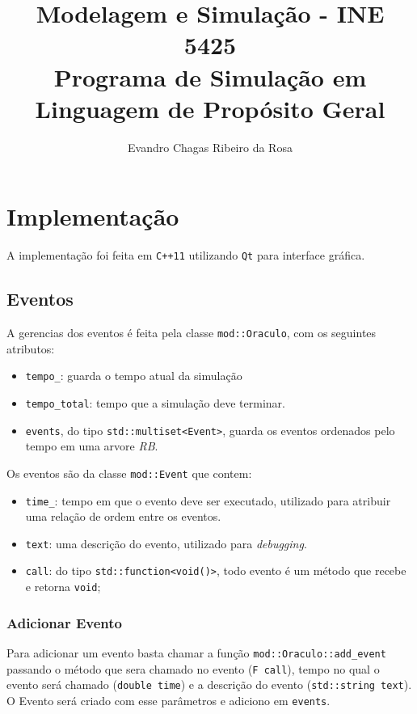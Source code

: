 \documentclass{article}
\title{Modelagem e Simulação - INE 5425\\
Programa de Simulação em Linguagem de Propósito Geral}
\author{Evandro Chagas Ribeiro da Rosa}
\begin{document}
\maketitle

\section{Implementação}
A implementação foi feita em \texttt{C++11} utilizando \texttt{Qt} para interface gráfica.

\subsection{Eventos}
A gerencias dos eventos é feita pela classe \texttt{mod::Oraculo}, com os
seguintes atributos:

\begin{itemize}
  \item \texttt{tempo\_}: guarda o tempo atual da simulação
  \item \texttt{tempo\_total}: tempo que a simulação deve terminar.
  \item \texttt{events}, do tipo \texttt{std::multiset<Event>}, guarda os eventos
    ordenados pelo tempo em uma arvore \textit{RB}.
\end{itemize}

Os eventos são da classe \texttt{mod::Event} que contem:
\begin{itemize}
  \item \texttt{time\_}: tempo em que o evento deve ser executado, utilizado para atribuir 
    uma relação de ordem entre os eventos.
  \item \texttt{text}: uma descrição do evento, utilizado para \textit{debugging}.
  \item \texttt{call}: do tipo \texttt{std::function<void()>}, todo evento é um método 
    que recebe e retorna \texttt{void};
\end{itemize}

\subsubsection{Adicionar Evento} 
Para adicionar um evento basta chamar a função \texttt{mod::Oraculo::add\_event} passando o
método que sera chamado no evento (\texttt{F call}), tempo no qual o evento será chamado
(\texttt{double time}) e a descrição do evento (\texttt{std::string text}). O Evento será
criado com esse parâmetros e adiciono em \texttt{events}.
\end{document}
